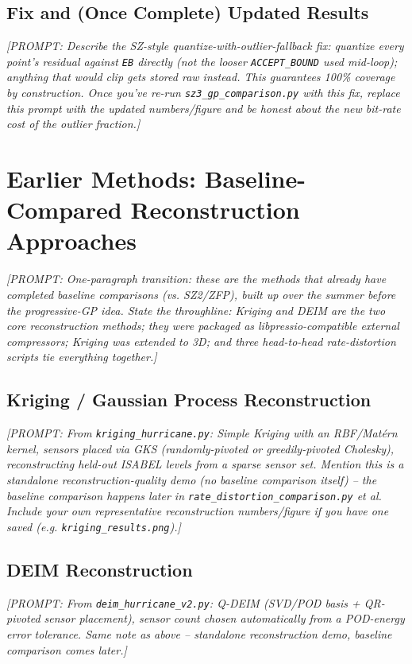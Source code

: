 \documentclass[11pt]{article}
\newcommand{\prompt}[1]{{\color{red}\itshape [PROMPT: #1]}\par\medskip}
\begin{document}
\subsection{Fix and (Once Complete) Updated Results}
\prompt{Describe the SZ-style quantize-with-outlier-fallback fix:
quantize every point's residual against \texttt{EB} directly (not the
looser \texttt{ACCEPT\_BOUND} used mid-loop); anything that would clip
gets stored raw instead. This guarantees 100\% coverage by construction.
Once you've re-run \texttt{sz3\_gp\_comparison.py} with this fix, replace
this prompt with the updated numbers/figure and be honest about the new
bit-rate cost of the outlier fraction.}

\section{Earlier Methods: Baseline-Compared Reconstruction Approaches}
\label{sec:earlier-methods}

\prompt{One-paragraph transition: these are the methods that already
have completed baseline comparisons (vs. SZ2/ZFP), built up over the
summer before the progressive-GP idea. State the throughline: Kriging
and DEIM are the two core reconstruction methods; they were packaged as
libpressio-compatible external compressors; Kriging was extended to 3D;
and three head-to-head rate-distortion scripts tie everything together.}

\subsection{Kriging / Gaussian Process Reconstruction}
\prompt{From \texttt{kriging\_hurricane.py}: Simple Kriging with an
RBF/Mat\'ern kernel, sensors placed via GKS (randomly-pivoted or
greedily-pivoted Cholesky), reconstructing held-out ISABEL levels from a
sparse sensor set. Mention this is a standalone reconstruction-quality
demo (no baseline comparison itself) -- the baseline comparison happens
later in \texttt{rate\_distortion\_comparison.py} et al. Include your own
representative reconstruction numbers/figure if you have one saved
(e.g. \texttt{kriging\_results.png}).}

\subsection{DEIM Reconstruction}
\prompt{From \texttt{deim\_hurricane\_v2.py}: Q-DEIM (SVD/POD basis +
QR-pivoted sensor placement), sensor count chosen automatically from a
POD-energy error tolerance. Same note as above -- standalone
reconstruction demo, baseline comparison comes later.}
\end{document}
